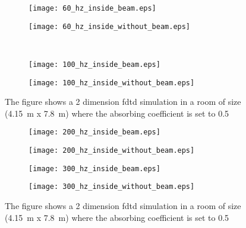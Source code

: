 \begin{figure}[H]
\begin{subfigure}[c]{0.5\textwidth}
\texttt{[image: 60\_hz\_inside\_beam.eps]}
\label{fig:Indoor_simulation_60_on}
\end{subfigure}
\begin{subfigure}[c]{0.5\textwidth}
\texttt{[image: 60\_hz\_inside\_without\_beam.eps]}
\label{fig:Indoor_simulation_60_off}
\end{subfigure}\\
\hspace{0.1\textheight}
\begin{subfigure}[c]{0.5\textwidth}
\texttt{[image: 100\_hz\_inside\_beam.eps]}
\label{fig:Indoor_simulation_100_on}
\end{subfigure}
\begin{subfigure}[c]{0.5\textwidth}
\texttt{[image: 100\_hz\_inside\_without\_beam.eps]}
\label{fig:Indoor_simulation_100_off}
\end{subfigure}
\caption{The figure shows a 2 dimension \gls{fdtd} simulation in a room of size  (\SI{4.15}{\meter} x \SI{7.8}{\meter}) where the absorbing coefficient is set to 0.5}
		\label{fig:Indoor_simulation_60_100}
\end{figure}


\begin{figure}[H]
\begin{subfigure}[c]{0.5\textwidth}
\texttt{[image: 200\_hz\_inside\_beam.eps]}
\label{fig:Indoor_simulation_200_on}
\end{subfigure}
\begin{subfigure}[c]{0.5\textwidth}
\texttt{[image: 200\_hz\_inside\_without\_beam.eps]}
\label{fig:Indoor_simulation_200_off}
\end{subfigure}
\begin{subfigure}[c]{0.5\textwidth}
\texttt{[image: 300\_hz\_inside\_beam.eps]}
\label{fig:Indoor_simulation_300_on}
\end{subfigure}
\begin{subfigure}[c]{0.5\textwidth}
\texttt{[image: 300\_hz\_inside\_without\_beam.eps]}
\label{fig:Indoor_simulation_300_off}
\end{subfigure}
\caption{The figure shows a 2 dimension \gls{fdtd} simulation in a room of size  (\SI{4.15}{\meter} x \SI{7.8}{\meter}) where the absorbing coefficient is set to 0.5}
		\label{fig:Indoor_simulation_200_300}
\end{figure}


